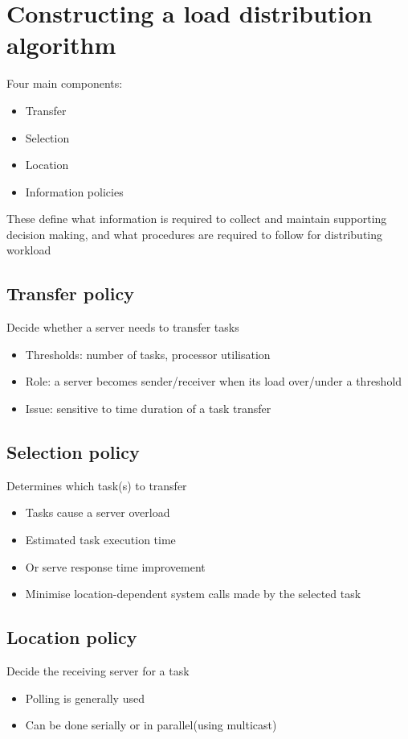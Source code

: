 \documentclass{article}[18pt]
\begin{document}
\section{Constructing a load distribution algorithm}
Four main components:
\begin{itemize}
	\item Transfer
	\item Selection
	\item Location
	\item Information policies
\end{itemize}
These define what information is required to collect and maintain supporting decision making, and what procedures are required to follow for distributing workload
\subsection{Transfer policy}
Decide whether a server needs to transfer tasks
\begin{itemize}
	\item Thresholds: number of tasks, processor utilisation
	\item Role: a server becomes sender/receiver when its load over/under a threshold
	\item Issue: sensitive to time duration of a task transfer
\end{itemize}
\subsection{Selection policy}
Determines which task(s) to transfer
\begin{itemize}
	\item Tasks cause a server overload
	\item Estimated task execution time
	\item Or serve response time improvement
	\item Minimise location-dependent system calls made by the selected task
\end{itemize}
\subsection{Location policy}
Decide the receiving server for a task
\begin{itemize}
	\item Polling is generally used
	\item Can be done serially or in parallel(using multicast)
\end{itemize}
\end{document}
